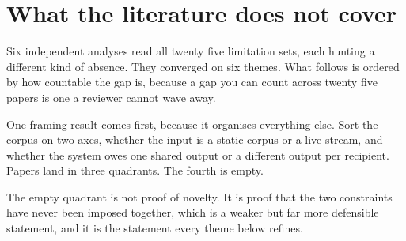 \section{What the literature does not cover}

Six independent analyses read all twenty five limitation sets, each hunting a
different kind of absence. They converged on six themes. What follows is
ordered by how countable the gap is, because a gap you can count across
twenty five papers is one a reviewer cannot wave away.

One framing result comes first, because it organises everything else. Sort the
corpus on two axes, whether the input is a static corpus or a live stream, and
whether the system owes one shared output or a different output per recipient.
Papers land in three quadrants. The fourth is empty.

\begin{center}
\end{center}

The empty quadrant is not proof of novelty. It is proof that the two
constraints have never been imposed together, which is a weaker but far more
defensible statement, and it is the statement every theme below refines.


